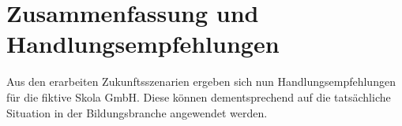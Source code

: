 \section{Zusammenfassung und Handlungsempfehlungen}
\label{conclusion}
Aus den erarbeiten Zukunftsszenarien ergeben sich nun Handlungsempfehlungen für die fiktive Skola GmbH. Diese können dementsprechend auf die tatsächliche Situation in der Bildungsbranche angewendet werden.